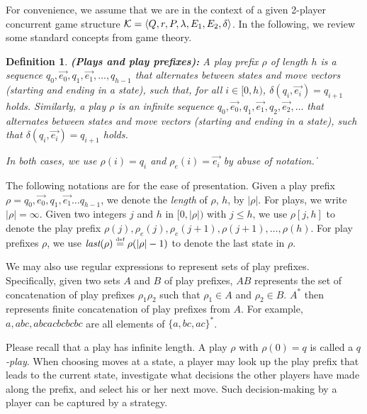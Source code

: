 \documentclass[times,10pt,twocolumn]{article}
\newtheorem{definition}{Definition}
\newcommand\qed{\hfill\ensuremath{\Box}}
\newcommand{\emlast}{\textit{last}}
\newcommand{\defn}{\stackrel{\mbox{\tiny def}}{=}}
\newcommand{\calk}{{\cal K}}
\def\qed{\ifmmode\|\else{\unskip\nobreak\hfil
\penalty50\hskip1em\null\nobreak\hfil$\blacksquare$
\parfillskip=0pt\finalhyphendemerits=0\endgraf}\fi}
\begin{document}
For convenience, we assume that we are in the context of a given 2-player 
concurrent game structure $\calk=\langle Q,r,P,\lambda,E_1,E_2,\delta\rangle$. 
In the following, we review some standard concepts from game theory. 

\begin{definition} \label{def.play}
\textbf{(Plays and play prefixes):}
A {\em play prefix} $\rho$ of length $h$ is a sequence
$q_0, \overrightarrow{e_0}, q_1, \overrightarrow{e_1}, \ldots, q_{h-1}$ that alternates between states and move vectors (starting and ending in a state), such that, for all $i \in [0,h)$,
$\delta(q_i, \overrightarrow{e_i})=q_{i+1}$ holds. 
Similarly, a \emph{play} $\rho$  is an infinite sequence
$q_0, \overrightarrow{e_0}, q_1, \overrightarrow{e_1}, q_2, \overrightarrow{e_2}, \ldots$ that alternates between states and move vectors (starting and ending in a state), such that 
$\delta(q_i, \overrightarrow{e_i})=q_{i+1}$ holds.

In both cases, we use $\rho(i)=q_i$ and $\rho_e(i)= \overrightarrow{e_i}$ by abuse of notation.
\qed
\end{definition}

The following notations are for the ease of presentation. 
Given a play prefix $\rho = q_0, \overrightarrow{e_0}, q_1, \overrightarrow{e_1} \ldots q_{h-1}$, 
we denote the {\em length} of $\rho$, $h$, by $|\rho|$. 
For plays, we write $|\rho|=\infty$. 
Given two integers $j$ and $h$ in $[0,|\rho|)$ 
with $j\leq h$, 
we use $\rho[j,h]$ to denote 
the play prefix $\rho(j),\rho_e(j),\rho_e(j+1),\rho(j+1),\ldots,\rho(h)$.
For play prefixes $\rho$, we use $\emlast(\rho)\defn\rho(|\rho|-1)$ to denote the last state in $\rho$.  

We may also use regular expressions to represent sets of play prefixes.  
\label{reply1.regexp.concat}
Specifically, given two sets $A$ and $B$ of play prefixes, 
$AB$ represents the set of concatenation of play prefixes $\rho_1\rho_2$ 
such that $\rho_1\in A$ and $\rho_2\in B$.  
$A^*$ then represents finite concatenation of play prefixes from $A$.  
For example, $a,abc,abcacbcbcbc$ are all elements of $\{a,bc,ac\}^*$.  

Please recall that a play has infinite length. 
A play $\rho$ with $\rho(0)=q$ is called a {\em $q$-play}.  
When choosing moves at a state, 
a player may look up the play prefix that leads to the current state, 
investigate what decisions the other players have made along the prefix, 
and select his or her next move. 
Such decision-making by a player can be captured by a strategy. 
\end{document}
